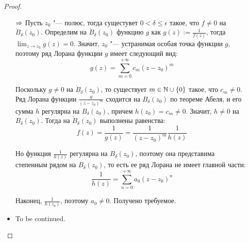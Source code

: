 \begin{proof}~
	\begin{itemize}
		\item[$\Rightarrow$]Пусть $z_0$ "--- полюс, тогда сущестувет $0 < \delta \le \epsilon$ такое, что $f \ne 0$ на $\mathring B_\delta(z_0)$. Определим на $\mathring B_\delta(z_0)$ функцию $g$ как $g(z) := \frac1{f(z)}$, тогда $\lim_{z \to z_0}g(z) = 0$. Значит, $z_0$ "--- устранимая особая точка функции $g$, поэтому ряд Лорана функции $g$ имеет следующий вид:
		\[g(z) = \sum_{m = 0}^{+\infty}c_m(z - z_0)^m\]
		
		Поскольку $g \ne 0$ на $\mathring B_\delta(z_0)$, то существует $m \in \mathbb{N} \cup \{0\}$ такое, что $c_m \ne 0$. Ряд Лорана функции $\frac{g}{(z - z_0)^m}$ сходится на $B_\delta(z_0)$ по теореме Абеля, и его сумма $h$ регулярна на $B_\delta(z_0)$, причем $h(z_0) = c_m \ne 0$. Значит, $h \ne 0$ на $B_\delta(z_0)$. Тогда на $\mathring B_\delta(z_0)$ выполнены равенства:
		\[f(z) = \frac{1}{g(z)} = \frac1{(z - z_0)^m}\frac1{h(z)}\]
		
		Но функция $\frac1{h(z)}$ регулярна на $B_\delta(z_0)$, поэтому она представима степенным рядом на $B_\delta(z_0)$, то есть ее ряд Лорана не имеет главной части:
		\[\frac{1}{h(z)} = \sum_{n=0}^{+\infty}a_0(z - z_0)^n\]
		
		Наконец, $\frac1{h(z_0)}$, поэтому $a_0 \ne 0$. Получено требуемое.
		\item To be continued.\qedhere
	\end{itemize}
\end{proof}